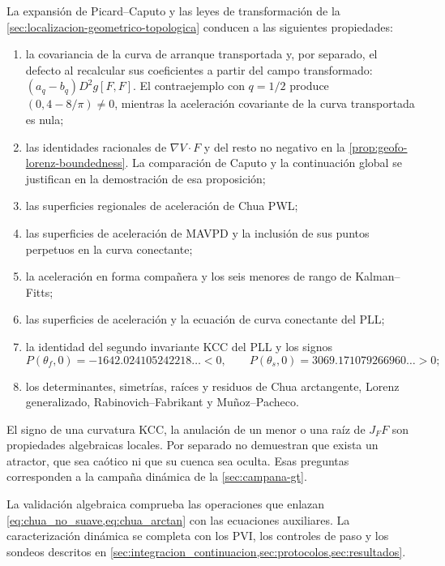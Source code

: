 La expansión de Picard--Caputo y las leyes de transformación de la
\cref{sec:localizacion-geometrico-topologica} conducen a las siguientes
propiedades:
\begin{enumerate}
 \item la covariancia de la curva de arranque transportada y, por separado,
 el defecto al recalcular sus coeficientes a partir del campo transformado:
 $(a_q-b_q)D^2g[F,F]$. El contraejemplo con $q=1/2$ produce
 $(0,4-8/\pi)\ne0$, mientras la aceleración covariante de la curva transportada
 es nula;
 \item las identidades racionales de $\nabla V\cdot F$ y del resto no negativo
 en la \cref{prop:geofo-lorenz-boundedness}. La comparación de Caputo y la
 continuación global se justifican en la demostración de esa proposición;
 \item las superficies regionales de aceleración de Chua PWL;
 \item las superficies de aceleración de MAVPD y la inclusión de sus puntos
 perpetuos en la curva conectante;
 \item la aceleración en forma compañera y los seis menores de rango de
 Kalman--Fitts;
 \item las superficies de aceleración y la ecuación de curva conectante del
 PLL;
 \item la identidad del segundo invariante KCC del PLL y los signos
 \[
 P(\theta_f,0)=-1642.024105242218\ldots<0,
 \qquad
 P(\theta_s,0)=3069.171079266960\ldots>0;
 \]
 \item los determinantes, simetrías, raíces y residuos de Chua arctangente,
 Lorenz generalizado, Rabinovich--Fabrikant y Muñoz--Pacheco.
\end{enumerate}
El signo de una curvatura KCC, la anulación de un menor o una raíz de
\(J_FF\) son propiedades algebraicas locales. Por separado no demuestran que
exista un atractor, que sea caótico ni que su cuenca sea oculta. Esas preguntas
corresponden a la campaña dinámica de la \cref{sec:campana-gt}.

La validación algebraica comprueba las operaciones que enlazan
\cref{eq:chua_no_suave,eq:chua_arctan} con las ecuaciones auxiliares. La
caracterización dinámica se completa con los PVI, los controles de paso y los
sondeos descritos en \cref{sec:integracion_continuacion,sec:protocolos,sec:resultados}.
